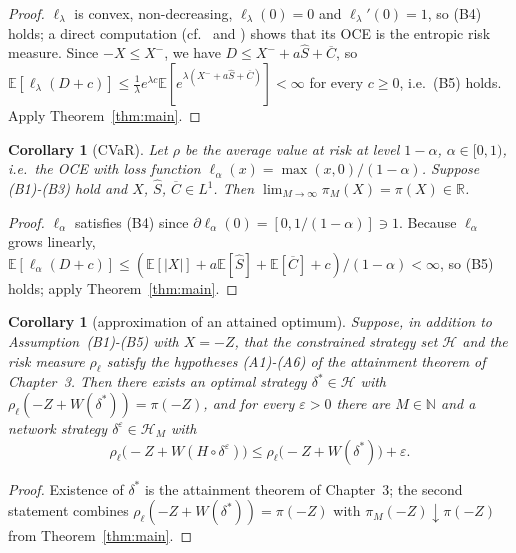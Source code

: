 \documentclass[11pt,a4paper]{report}
\numberwithin{equation}{chapter}
\theoremstyle{plain}
\newtheorem{corollary}[proposition]{Corollary}
\theoremstyle{definition}
\newcommand{\E}{\mathbb{E}}
\newcommand{\R}{\mathbb{R}}
\newcommand{\N}{\mathbb{N}}
\newcommand{\HH}{\mathcal{H}}
\begin{document}
\begin{proof}
    $\ell_\lambda$ is convex, non-decreasing, $\ell_\lambda(0)=0$ and $\ell_\lambda'(0)=1$, so (B4) holds; a direct computation (cf.\ \cite[Example~2]{buehler} and \cite{bentalteboulle}) shows that its OCE is the entropic risk measure. Since $-X\le X^-$, we have $D\le X^-+a\widehat S+\overline C$, so $\E[\ell_\lambda(D+c)]\le\frac{1}{\lambda}e^{\lambda c}\E[e^{\lambda(X^-+a\widehat S+\overline C)}]<\infty$ for every $c\ge0$, i.e.\ (B5) holds. Apply Theorem~\ref{thm:main}.
\end{proof}

\begin{corollary}[CVaR]\label{cor:cvar}
    Let $\rho$ be the average value at risk at level $1-\alpha$, $\alpha\in[0,1)$, i.e.\ the OCE with loss function $\ell_\alpha(x)=\max(x,0)/(1-\alpha)$. Suppose \textup{(B1)-(B3)} hold and $X$, $\widehat S$, $\overline C\in L^1$. Then $\lim_{M\to\infty}\pi_M(X)=\pi(X)\in\R$.
\end{corollary}

\begin{proof}
    $\ell_\alpha$ satisfies (B4) since $\partial\ell_\alpha(0)=[0,1/(1-\alpha)]\ni1$. Because $\ell_\alpha$ grows linearly, $\E[\ell_\alpha(D+c)]\le(\E[|X|]+a\E[\widehat S]+\E[\overline C]+c)/(1-\alpha)<\infty$, so (B5) holds; apply Theorem~\ref{thm:main}.
\end{proof}

\begin{corollary}[approximation of an attained optimum]\label{cor:attainment}
    Suppose, in addition to Assumption~\textup{(B1)-(B5)} with $X=-Z$, that the constrained strategy set $\HH$ and the risk measure $\rho_\ell$ satisfy the hypotheses \textup{(A1)-(A6)} of the attainment theorem of Chapter~3. Then there exists an optimal strategy $\delta^*\in\HH$ with $\rho_\ell(-Z+W(\delta^*))=\pi(-Z)$, and for every $\varepsilon>0$ there are $M\in\N$ and a network strategy $\delta^\varepsilon\in\HH_M$ with
    \[
        \rho_\ell\bigl(-Z+W(H\circ\delta^\varepsilon)\bigr)\le\rho_\ell\bigl(-Z+W(\delta^*)\bigr)+\varepsilon.
    \]
\end{corollary}

\begin{proof}
    Existence of $\delta^*$ is the attainment theorem of Chapter~3; the second statement combines $\rho_\ell(-Z+W(\delta^*))=\pi(-Z)$ with $\pi_M(-Z)\downarrow\pi(-Z)$ from Theorem~\ref{thm:main}.
\end{proof}
\end{document}
